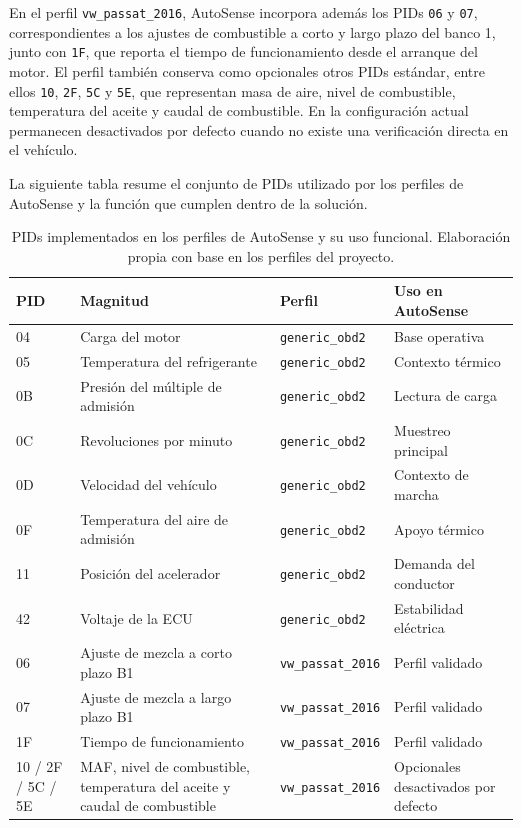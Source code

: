 \documentclass[12pt,letterpaper]{report}
\begin{document}
En el perfil \texttt{vw\_passat\_2016}, AutoSense incorpora además los PIDs \texttt{06} y \texttt{07}, correspondientes a los ajustes de combustible a corto y largo plazo del banco 1, junto con \texttt{1F}, que reporta el tiempo de funcionamiento desde el arranque del motor. El perfil también conserva como opcionales otros PIDs estándar, entre ellos \texttt{10}, \texttt{2F}, \texttt{5C} y \texttt{5E}, que representan masa de aire, nivel de combustible, temperatura del aceite y caudal de combustible. En la configuración actual permanecen desactivados por defecto cuando no existe una verificación directa en el vehículo.

La siguiente tabla resume el conjunto de PIDs utilizado por los perfiles de AutoSense y la función que cumplen dentro de la solución.

\begin{table}[!htbp]
\centering
\scriptsize
\renewcommand{\arraystretch}{1.05}
\setlength{\tabcolsep}{3.5pt}
\begin{tabular}{p{}p{}p{}p{}}
\toprule
PID & Magnitud & Perfil & Uso en AutoSense \\
\midrule
04 & Carga del motor & \texttt{generic\_obd2} & Base operativa \\
05 & Temperatura del refrigerante & \texttt{generic\_obd2} & Contexto térmico \\
0B & Presión del múltiple de admisión & \texttt{generic\_obd2} & Lectura de carga \\
0C & Revoluciones por minuto & \texttt{generic\_obd2} & Muestreo principal \\
0D & Velocidad del vehículo & \texttt{generic\_obd2} & Contexto de marcha \\
0F & Temperatura del aire de admisión & \texttt{generic\_obd2} & Apoyo térmico \\
11 & Posición del acelerador & \texttt{generic\_obd2} & Demanda del conductor \\
42 & Voltaje de la ECU & \texttt{generic\_obd2} & Estabilidad eléctrica \\
06 & Ajuste de mezcla a corto plazo B1 & \texttt{vw\_passat\_2016} & Perfil validado \\
07 & Ajuste de mezcla a largo plazo B1 & \texttt{vw\_passat\_2016} & Perfil validado \\
1F & Tiempo de funcionamiento & \texttt{vw\_passat\_2016} & Perfil validado \\
10 / 2F / 5C / 5E & MAF, nivel de combustible, temperatura del aceite y caudal de combustible & \texttt{vw\_passat\_2016} & Opcionales desactivados por defecto \\
\bottomrule
\end{tabular}
\caption{PIDs implementados en los perfiles de AutoSense y su uso funcional. Elaboración propia con base en los perfiles del proyecto.}
\end{table}
\end{document}
